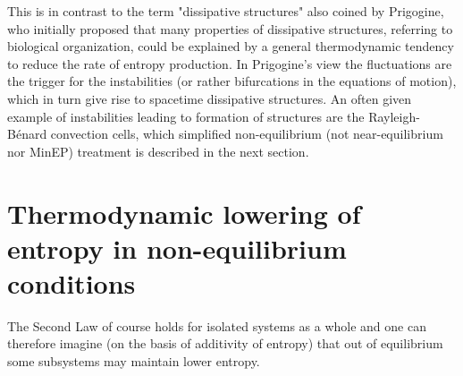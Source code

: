 \documentclass[a4paper,12pt]{article}
\begin{document}
This is in contrast to the term "dissipative structures" also coined by Prigogine, who initially proposed that many properties of dissipative structures, referring to biological organization, could be explained by a general thermodynamic tendency to reduce the rate of entropy production. In Prigogine's view the fluctuations are the trigger for the instabilities (or rather bifurcations in the equations of motion), which in turn give rise to spacetime dissipative structures. 
An often given example of instabilities leading to formation of structures are the Rayleigh-Bénard convection cells, which simplified non-equilibrium (not near-equilibrium nor MinEP) treatment is described in the next section.


\section{Thermodynamic lowering of entropy in non-equilibrium conditions}
\label{simple-model}

The Second Law of course holds for isolated systems as a whole and one can therefore imagine (on the basis of additivity of entropy) that out of equilibrium some subsystems may maintain lower entropy.
\end{document}
